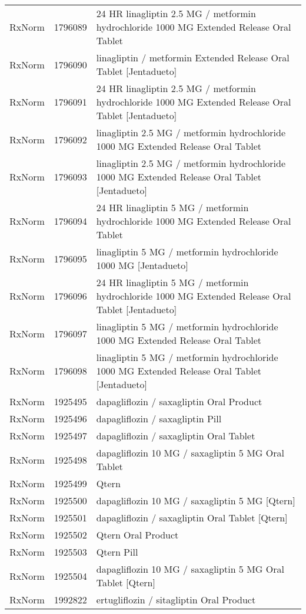 \begin{longtable}{p{}p{}p{}}
  RxNorm & 1796089 & 24 HR linagliptin 2.5 MG / metformin hydrochloride 1000 MG Extended Release Oral Tablet \\ 
  RxNorm & 1796090 & linagliptin / metformin Extended Release Oral Tablet [Jentadueto] \\ 
  RxNorm & 1796091 & 24 HR linagliptin 2.5 MG / metformin hydrochloride 1000 MG Extended Release Oral Tablet [Jentadueto] \\ 
  RxNorm & 1796092 & linagliptin 2.5 MG / metformin hydrochloride 1000 MG Extended Release Oral Tablet \\ 
  RxNorm & 1796093 & linagliptin 2.5 MG / metformin hydrochloride 1000 MG Extended Release Oral Tablet [Jentadueto] \\ 
  RxNorm & 1796094 & 24 HR linagliptin 5 MG / metformin hydrochloride 1000 MG Extended Release Oral Tablet \\ 
  RxNorm & 1796095 & linagliptin 5 MG / metformin hydrochloride 1000 MG [Jentadueto] \\ 
  RxNorm & 1796096 & 24 HR linagliptin 5 MG / metformin hydrochloride 1000 MG Extended Release Oral Tablet [Jentadueto] \\ 
  RxNorm & 1796097 & linagliptin 5 MG / metformin hydrochloride 1000 MG Extended Release Oral Tablet \\ 
  RxNorm & 1796098 & linagliptin 5 MG / metformin hydrochloride 1000 MG Extended Release Oral Tablet [Jentadueto] \\ 
  RxNorm & 1925495 & dapagliflozin / saxagliptin Oral Product \\ 
  RxNorm & 1925496 & dapagliflozin / saxagliptin Pill \\ 
  RxNorm & 1925497 & dapagliflozin / saxagliptin Oral Tablet \\ 
  RxNorm & 1925498 & dapagliflozin 10 MG / saxagliptin 5 MG Oral Tablet \\ 
  RxNorm & 1925499 & Qtern \\ 
  RxNorm & 1925500 & dapagliflozin 10 MG / saxagliptin 5 MG [Qtern] \\ 
  RxNorm & 1925501 & dapagliflozin / saxagliptin Oral Tablet [Qtern] \\ 
  RxNorm & 1925502 & Qtern Oral Product \\ 
  RxNorm & 1925503 & Qtern Pill \\ 
  RxNorm & 1925504 & dapagliflozin 10 MG / saxagliptin 5 MG Oral Tablet [Qtern] \\ 
  RxNorm & 1992822 & ertugliflozin / sitagliptin Oral Product \\ 

\end{longtable}
